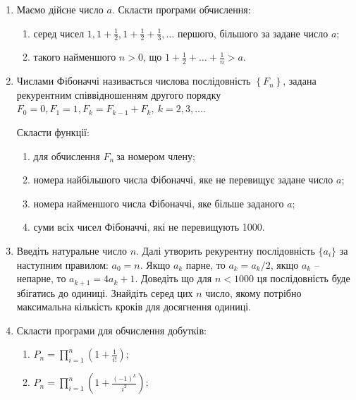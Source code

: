 \documentclass[a5paper,titlepage,openany,twoside,
]
{book_unv}%
\makeatletter
\newcommand{\xslalph}[1]{\expandafter\@xslalph\csname c@#1\endcsname}
\newcommand{\@xslalph}[1]{%
    \ifcase#1\or а\or б\or в\or г\or д\or e\or є\or ж\or з\or i%
    \or й\or к\or л\or м\or н\or о\or п\or р\or с\or т%
    \or у\or ф\or х\or ц\or ч\or ш\or ю\or я\or аа\or бб\or вв%
    \else\@ctrerr\fi%
}
\makeatother
\begin{document}
\begin{enumerate}
\def\labelenumi{\arabic{enumi})}
\item
  Маємо дійсне число $a$. Скласти програми обчислення:
\begin{enumerate}[label=\xslalph*)]
\item серед чисел
\(1,1 + \frac{1}{2},1 + \frac{1}{2} + \frac{1}{3},\ldots\) першого,
більшого за задане число $a$;

\item такого найменшого $n>0$, що
\(1 + \frac{1}{2} + \ldots + \frac{1}{n} > a.\)

\end{enumerate}

\item
  Числами Фібоначчі називається числова послідовність
  \(\left\{ F_{n} \right\}\), задана рекурентним співвідношенням другого
  порядку
  \(F_{0} = 0,F_{1} = 1,F_{k} = F_{k - 1} + F_{k},\ k = 2,3,\ldots\).

Скласти функції:
\begin{enumerate}[label=\xslalph*)]
\item
для обчислення \(F_{n}\ \)за номером члену;
\item номера найбільшого числа Фібоначчі, яке не перевищує задане число
$a$;
\item номера найменшого числа Фібоначчі, яке більше заданого $a$;
\item суми всіх чисел Фібоначчі, які не перевищують 1000.

\end{enumerate}

\item
  Введіть натуральне число $n$. Далі утворить рекурентну послідовність
  \(\{a_{i}\}\) за наступним правилом: \(a_{0} = n\). Якщо \(a_{k}\) парне,
  то \(a_{k} = a_{k}/2\), якщо $a_k$ -- непарне, то \(a_{k + 1} = 4a_{k} + 1\). Доведіть
  що для $n<1000$ ця послідовність буде збігатись до
  одиниці. Знайдіть серед цих $n$ число, якому потрібно максимальна
  кількість кроків для досягнення одиниці.
\item
  Скласти програми для обчислення добутків:
\begin{enumerate}[label=\xslalph*)]
\item \(P_{n} = \prod\limits_{i = 1}^{n}\left( 1 + \frac{1}{i!} \right);\) 
\item
\(P_{n} = \prod\limits_{i = 1}^{n}\left(1 + \frac{(-1)^{k}}{i^{2}} \right);\)
\end{enumerate}


\end{enumerate}
\end{document}
